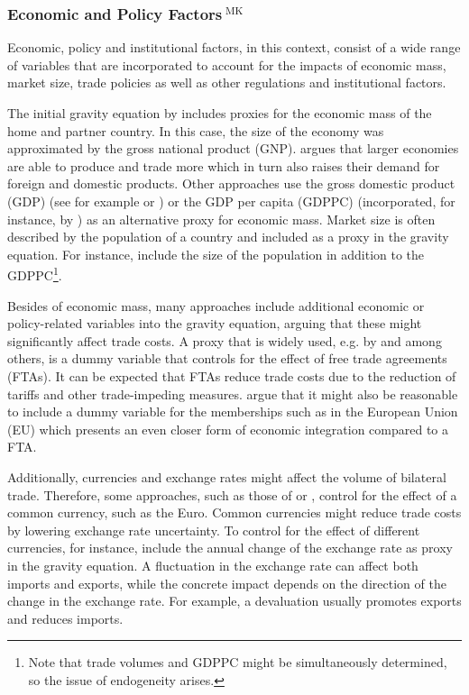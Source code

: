 \subsubsection[Economic and Policy Factors]{Economic and Policy Factors$^{\text{ MK}}$}
\label{EPF}

Economic, policy and institutional factors, in this context, consist of a wide range of variables that are incorporated to account for the impacts of economic mass, market size, trade policies as well as other regulations and institutional factors. 

The initial gravity equation by \textcite{tinbergen1962shaping} includes proxies for the economic mass of the home and partner country. In this case, the size of the economy was approximated by the gross national product (GNP). \textcite{tinbergen1962shaping} argues that larger economies are able to produce and trade more which in turn also raises their demand for foreign and domestic products. Other approaches use the gross domestic product (GDP) (see for example \textcite{Brau2013} or \textcite{Nordas2017}) or the GDP per capita (GDPPC) (incorporated, for instance, by \textcite{Kimura2006}) as an alternative proxy for economic mass. Market size is often described by the population of a country and included as a proxy in the gravity equation. For instance, \textcite{Kimura2006} include the size of the population in addition to the GDPPC\footnote{Note that trade volumes and GDPPC might be simultaneously determined, so the issue of endogeneity arises.}.   

Besides of economic mass, many approaches include additional economic or policy-related variables into the gravity equation, arguing that these might significantly affect trade costs. A proxy that is widely used, e.g. by \textcite{Kimura2006} and \textcite{DAS2023106246} among others, is a dummy variable that controls for the effect of free trade agreements (FTAs). It can be expected that FTAs reduce trade costs due to the reduction of tariffs and other trade-impeding measures. \textcite{Nordas2017} argue that it might also be reasonable to include a dummy variable for the memberships such as in the European Union (EU) which presents an even closer form of economic integration compared to a FTA. 

Additionally, currencies and exchange rates might affect the volume of bilateral trade. Therefore, some approaches, such as those of \textcite{Brau2013} or \textcite{SANTANAGALLEGO20161026}, control for the effect of a common currency, such as the Euro. Common currencies might reduce trade costs by lowering exchange rate uncertainty. To control for the effect of different currencies, for instance, \textcite{Tadesse2010} include the annual change of the exchange rate as proxy in the gravity equation. A fluctuation in the exchange rate can affect both imports and exports, while the concrete impact depends on the direction of the change in the exchange rate. For example, a devaluation usually promotes exports and reduces imports. 

